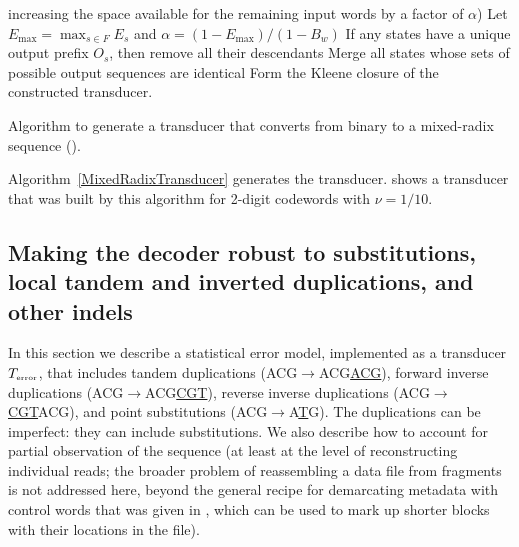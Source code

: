 \documentclass[english]{article}
\begin{document}
\begin{algorithm}
{{                  increasing the space available for the remaining input words by a factor of $\alpha$)}
          \;
          Let $E_{\max} = \max_{s \in F} E_s$ and $\alpha = (1 - E_{\max}) / (1 - B_w)$
          \;
        }
    If any states have a unique output prefix $O_s$, then remove all their descendants
        \;
        Merge all states whose sets of possible output sequences are identical
        \;
        Form the Kleene closure of the constructed transducer.
\caption{
  \label{MixedRadixTransducer}
  Algorithm to generate a transducer that converts from binary to a mixed-radix sequence
  ().
}
\end{algorithm}

Algorithm~\ref{MixedRadixTransducer} generates the transducer.
 shows a transducer that was built by this algorithm
for 2-digit codewords with $\nu=1/10$.



\subsection{Making the decoder robust to substitutions, local tandem and inverted duplications, and other indels}

In this section we describe a statistical error model,
implemented as a transducer $T_{\mbox{\tiny error}}$,
that includes
tandem duplications (ACG$\to$ACG\underline{ACG}),
forward inverse duplications (ACG$\to$ACG\underline{CGT}),
reverse inverse duplications (ACG$\to$\underline{CGT}ACG),
and point substitutions (ACG$\to$A\underline{T}G).
The duplications can be imperfect: they can include substitutions.
We also describe how to account for partial observation of the sequence
(at least at the level of reconstructing individual reads;
the broader problem of reassembling a data file from fragments is not addressed here,
beyond the general recipe for demarcating metadata with control words
that was given in , which can be used to mark up shorter blocks
with their locations in the file).
\end{document}
